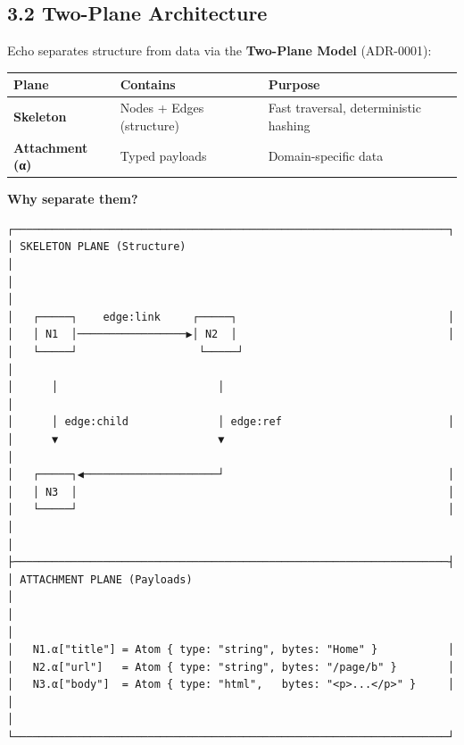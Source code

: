 \documentclass[
]{book}
\newcounter{none} %
\begin{document}
\subsection{3.2 Two-Plane Architecture}\label{two-plane-architecture}

Echo separates structure from data via the \textbf{Two-Plane Model}
(ADR-0001):

{\def\LTcaptype{none} %
\begin{longtable}[]{@{}
  >{\raggedright\arraybackslash}p{}
  >{\raggedright\arraybackslash}p{}
  >{\raggedright\arraybackslash}p{}@{}}
\toprule\noalign{}
\begin{minipage}[b]{\linewidth}\raggedright
Plane
\end{minipage} & \begin{minipage}[b]{\linewidth}\raggedright
Contains
\end{minipage} & \begin{minipage}[b]{\linewidth}\raggedright
Purpose
\end{minipage} \\
\midrule\noalign{}
\endhead
\bottomrule\noalign{}
\endlastfoot
\textbf{Skeleton} & Nodes + Edges (structure) & Fast traversal,
deterministic hashing \\
\textbf{Attachment (α)} & Typed payloads & Domain-specific data \\
\end{longtable}
}

\textbf{Why separate them?}

\begin{verbatim}
┌────────────────────────────────────────────────────────────────────┐
│ SKELETON PLANE (Structure)                                          │
│                                                                     │
│   ┌─────┐    edge:link     ┌─────┐                                 │
│   │ N1  │─────────────────▶│ N2  │                                 │
│   └─────┘                   └─────┘                                 │
│      │                         │                                    │
│      │ edge:child              │ edge:ref                          │
│      ▼                         ▼                                    │
│   ┌─────┐◀─────────────────────┘                                   │
│   │ N3  │                                                          │
│   └─────┘                                                          │
│                                                                     │
├────────────────────────────────────────────────────────────────────┤
│ ATTACHMENT PLANE (Payloads)                                         │
│                                                                     │
│   N1.α["title"] = Atom { type: "string", bytes: "Home" }           │
│   N2.α["url"]   = Atom { type: "string", bytes: "/page/b" }        │
│   N3.α["body"]  = Atom { type: "html",   bytes: "<p>...</p>" }     │
│                                                                     │
└────────────────────────────────────────────────────────────────────┘
\end{verbatim}
\end{document}
